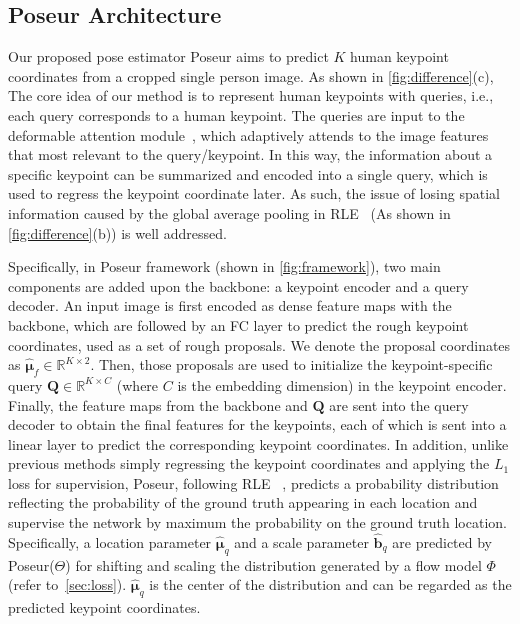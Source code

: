 \documentclass[runningheads]{llncs}
\def\ie{{i.e.\xspace}}
\def\handle{{Poseur}\xspace}
\def\R{{\mathbb R}}
\def\Loc{{\boldsymbol{\mu}}}
\def\b{{\boldsymbol{b}}}
\def\KPF{{\hat{\mathbf{\Loc}}_f}}
\def\KPQ{{\hat{\mathbf{\Loc}}_q}}
\def\KBQ{{\hat{\mathbf{\b}}_q}}
\begin{document}
\subsection{\handle Architecture}\label{sec:Architecture}






Our proposed pose estimator \handle aims to predict $K$ human keypoint coordinates from a cropped single person image.
As shown in \cref{fig:difference}(c), The core idea of our method is to represent human keypoints with queries, \ie, each query corresponds to a human keypoint. The queries are input to the deformable attention module~\cite{zhu2020deformable}, which adaptively attends to the image features that most relevant to the query/keypoint. In this way, the information about a specific keypoint can be summarized and encoded into a single query, which is used to regress the keypoint coordinate later. As such, the issue of losing spatial information caused by the global average pooling in RLE~\cite{li2021human} (As shown in \cref{fig:difference}(b)) is well addressed.





Specifically, in \handle framework (shown in \cref{fig:framework}), two main components are added upon the backbone: a keypoint encoder and a query decoder. An input image is first encoded as dense feature maps with the backbone, which are followed by an FC layer to predict the rough keypoint coordinates, used as a set of rough proposals.
We denote the proposal coordinates as $\KPF \in \R^{K \times 2}$. Then, those proposals are used to initialize the keypoint-specific query $\mathbf{Q} \in \R^{K \times C}$ (where $C$ is the embedding dimension) in the keypoint encoder. Finally, the feature maps from the backbone and $\mathbf{Q}$ are sent into the query decoder to obtain the final features for the keypoints, each of which is sent into a linear layer to predict the corresponding keypoint coordinates.
In addition, unlike previous methods simply regressing the keypoint coordinates and applying the $L_1$ loss for supervision, 
\handle, following RLE ~\cite{li2021human}, predicts a probability distribution reflecting the probability of the ground truth appearing in each location and supervise the network by maximum the probability on the ground truth location. Specifically, a location parameter $\KPQ$ and a scale parameter $\KBQ$ are predicted by \handle ($\Theta$) for shifting and scaling the distribution generated by a flow model $\Phi$ (refer to~\cref{sec:loss}). $\KPQ$ is the center of the distribution and can be regarded as the predicted keypoint coordinates.
\end{document}
